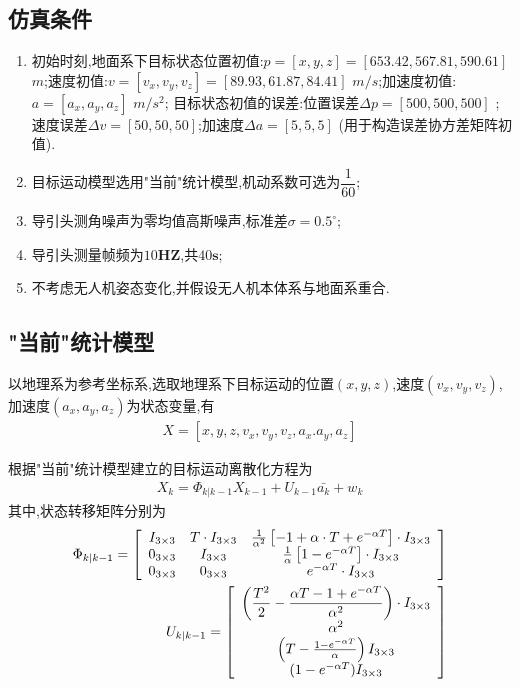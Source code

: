 \documentclass[12pt]{article}
\numberwithin{equation}{section} %
\begin{document}
\subsection{仿真条件}
\begin{enumerate}
    \item 初始时刻,地面系下目标状态位置初值:$p=[x, y, z]=[653.42,567.81,590.61]$ $m$;速度初值:$v=[v_x,v_y,v_z]=[89.93,61.87,84.41]$ $m/s$;加速度初值:$a=[a_x,a_y,a_z]$ $m/s^2$; 目标状态初值的误差:位置误差$\Delta p =[500,500,500]$ ;速度误差$\Delta v = [50, 50, 50]$;加速度$\Delta a = [5,5,5]$ (用于构造误差协方差矩阵初值).
    \item 目标运动模型选用"当前"统计模型,机动系数可选为$\dfrac{1}{60}$;
    \item 导引头测角噪声为零均值高斯噪声,标准差$\sigma = 0.5^{\circ}$;
    \item 导引头测量帧频为$10\mathbf{HZ}$,共$40\mathbf{s}$;
    \item 不考虑无人机姿态变化,并假设无人机本体系与地面系重合.
\end{enumerate}

\subsection{"当前"统计模型}
以地理系为参考坐标系,选取地理系下目标运动的位置$(x,y,z)$,速度$(v_x,v_y,v_z)$,加速度$(a_x,a_y,a_z)$为状态变量,有
\begin{align}
    X = [x,y,z,v_x,v_y,v_z,a_x.a_y,a_z]
\end{align}

根据"当前"统计模型建立的目标运动离散化方程为
\begin{align}
    X_k = \Phi_{k|k-1}X_{k-1} + U_{k-1}\bar{a_k} + w_k
\end{align}
其中,状态转移矩阵分别为
\begin{align}
    \Phi_{k|k-1}=\left[
        \begin{array}{c c c}
        {{I_{3\times3}}}&{{T\cdot I_{3\times3}}}&{{\frac{1}{\alpha^{2}}\left[-1+\alpha\cdot T+e^{-\alpha T}\right]\cdot I_{3\times3}}}\\ {{0_{3\times3}}}&{{I_{3\times3}}}&{{\frac{1}{\alpha}\left[1-e^{-\alpha T}\right]\cdot I_{3\times3}}}\\ {{0_{3\times3}}}&{{0_{3\times3}}}&{{e^{-\alpha T}\cdot I_{3\times3}}}\end{array}
        \right] \\
    U_{k|k-1}=\left[\begin{array}{c}{{\left(\displaystyle\frac{T^{2}}{2}-\frac{\alpha T-1+e^{-\alpha T}}{\alpha^{2}}\right)\cdot I_{3\times3}}}\\ {{\alpha^{2}}}\\ {{\left(T-\frac{1-e^{-\alpha T}}{\alpha}\right)I_{3\times3}}}\\ {{(1-e^{-\alpha T})I_{3\times3}}}\end{array}\right]
\end{align}
\end{document}
